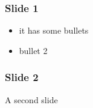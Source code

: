 \begin{frame}[fragile]
\frametitle{Slide 1}

\begin{itemize}[<+-| alert@+>]

\item it has some bullets

\item bullet 2
\end{itemize}
\end{frame}

\begin{frame}[fragile]
\frametitle{Slide 2}


A second slide
\end{frame}
